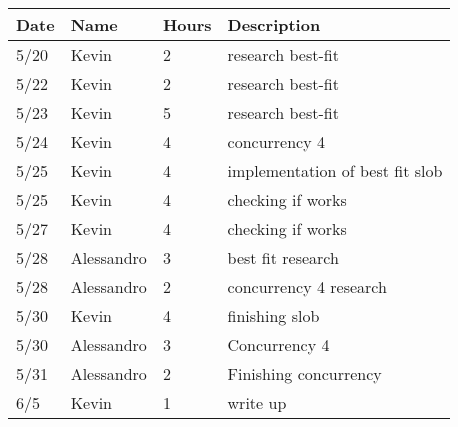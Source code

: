 \begin{tabular}{l l l l}\textbf{Date} & \textbf{Name} & \textbf{Hours} & \textbf{Description}\\\hline

5/20 & Kevin &2 & research best-fit\\\hline
5/22 & Kevin &2 & research best-fit\\\hline
5/23 & Kevin &5 & research best-fit\\\hline
5/24& Kevin &4 & concurrency 4\\\hline
5/25& Kevin &4 & implementation of best fit slob\\\hline
5/25& Kevin &4 & checking if works\\\hline
5/27& Kevin &4 & checking if works\\\hline
5/28& Alessandro & 3 & best fit research\\\hline
5/28& Alessandro & 2 & concurrency 4 research\\\hline
5/30& Kevin &4 & finishing slob\\\hline
5/30& Alessandro &3 & Concurrency 4\\\hline
5/31& Alessandro &2 & Finishing concurrency\\\hline
6/5& Kevin &1 & write up\\\hline
\end{tabular}